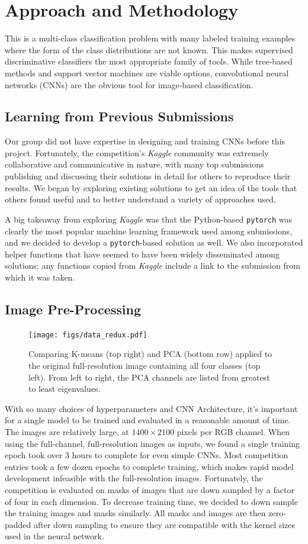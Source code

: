 \section{Approach and Methodology}
This is a multi-class classification problem with many labeled training examples where the form of the class distributions are not known. This makes supervised discriminative classifiers the most appropriate family of tools. While tree-based methods and support vector machines are viable options, convolutional neural networks (CNNs) are the obvious tool for image-based classification.

\subsection{Learning from Previous Submissions}
Our group did not have expertise in designing and training CNNs before this project. Fortunately, the competition's \textit{Kaggle} community was extremely collaborative and communicative in nature, with many top submissions publishing and discussing their solutions in detail for others to reproduce their results. We began by exploring existing solutions to get an idea of the tools that others found useful and to better understand a variety of approaches used. 

A big takeaway from exploring \textit{Kaggle} was that the Python-based \texttt{pytorch} was clearly the most popular machine learning framework used among submissions, and we decided to develop a \texttt{pytorch}-based solution as well. We also incorporated helper functions that have seemed to have been widely disseminated among solutions; any functions copied from \textit{Kaggle} include a link to the submission from which it was taken. 

\subsection{Image Pre-Processing}
\begin{figure}[htbp]
    \centering
    \texttt{[image: figs/data\_redux.pdf]}
    \caption{Comparing K-means (top right) and PCA (bottom row) applied to the original full-resolution image containing all four classes (top left). From left to right, the PCA channels are listed from greatest to least eigenvalues.}
    \label{fig:PCA}
\end{figure}
%
With so many choices of hyperparameters and CNN Architecture, it's important for a single model to be trained and evaluated in a reasonable amount of time. The images are relatively large, at \(1400 \times 2100\) pixels per RGB channel. When using the full-channel, full-resolution images as inputs, we found a single training epoch took over 3 hours to complete for even simple CNNs. Most competition entries took a few dozen epochs to complete training, which makes rapid model development infeasible with the full-resolution images. Fortunately, the competition is evaluated on masks of images that are down sampled by a factor of four in each dimension. To decrease training time, we decided to down sample the training images and masks similarly. All masks and images are then zero-padded after down sampling to ensure they are compatible with the kernel sizes used in the neural network. 

